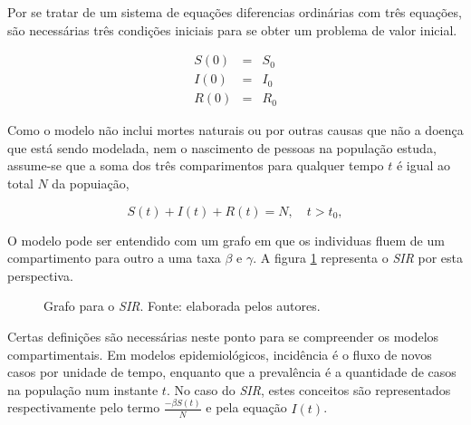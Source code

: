 Por se tratar de um sistema de equações diferencias ordinárias com três equações,
são necessárias três condições iniciais para se obter um problema de valor
inicial.

\begin{eqnarray}
   S(0) &=& S_0 \label{eq:SIR-S0}\\
   I(0) &=& I_0 \label{eq:SIR-I0}\\
   R(0) &=& R_0 \label{eq:SIR-R0}
\end{eqnarray}

Como o modelo não inclui mortes naturais ou por outras causas que não a doença
que está sendo modelada, nem o nascimento de pessoas na população estuda, assume-se
que a soma dos três comparimentos para qualquer tempo $t$ é igual ao total 
$N$ da popuiação,

\begin{equation}
   S(t) + I(t) + R(t) = N,  \quad t > t_0, \label{eq:SIR-4}
\end{equation}

O modelo pode ser entendido com um grafo em que os individuas fluem de um 
compartimento para outro a uma taxa $\beta$ e $\gamma$. 
A figura \ref{fig:sir-grafo} representa o \textit{SIR} por esta perspectiva.

\begin{figure}
\centering
{}
\caption{Grafo para o \textit{SIR}. Fonte: elaborada pelos autores.}
\label{fig:sir-grafo}
\end{figure}

Certas definições são necessárias neste ponto para se compreender os modelos compartimentais. 
Em modelos epidemiológicos, incidência é o fluxo de novos casos por unidade de tempo,
enquanto que a prevalência é a quantidade de casos na população num instante $t$.
No caso do \textit{SIR}, estes conceitos são representados respectivamente pelo
termo $\frac{-\beta S(t)}{N}$ e pela equação $I(t)$. 

